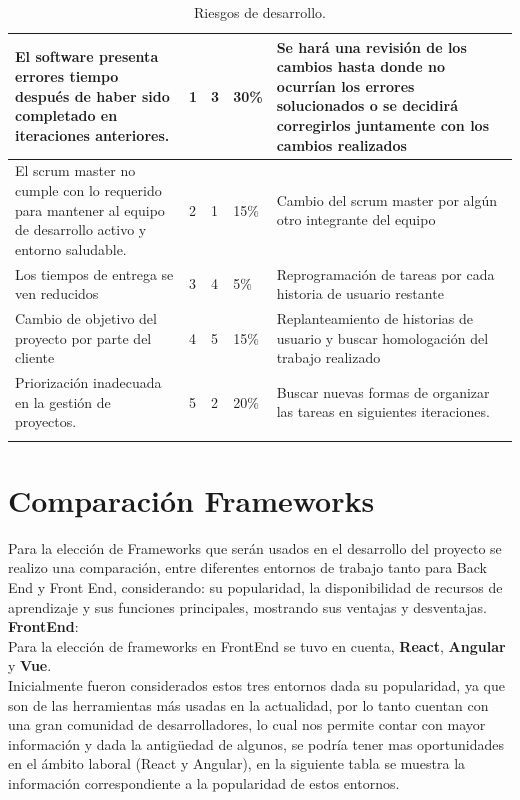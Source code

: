 \documentclass[a4paper,12 pt]{article}
\begin{document}
{\begin{longtable}{|M{4cm}|M{1cm}|M{1.5cm}|M{2.5cm}|M{6cm}|}
    \hline
    El software presenta errores tiempo después de haber sido completado en
    iteraciones anteriores.
    & 1 & 3  & 30\%  
    & Se hará una revisión de los cambios hasta donde no ocurrían los errores
    solucionados o se decidirá corregirlos juntamente con los cambios realizados
    \\
    \hline
    El scrum master no cumple con lo requerido para mantener al equipo de
    desarrollo activo y entorno saludable.
    & 2 & 1  &  15\%
    &  Cambio del scrum master por algún otro integrante del equipo  \\
    \hline
    Los tiempos de entrega se ven reducidos
    & 3 &  4 & 5\%  
    &  Reprogramación de tareas por cada historia de usuario restante \\
    \hline
    Cambio de objetivo del proyecto por parte del cliente
    & 4 & 5  & 15\%  
    & Replanteamiento de historias de usuario y buscar homologación del trabajo
    realizado  \\
    \hline
    Priorización inadecuada en la gestión de proyectos.
    & 5 & 2  & 20\%
    & Buscar nuevas formas de organizar las tareas en siguientes iteraciones. \\
    \hline
    \caption{Riesgos de desarrollo.} 
    \label{Riesgos}
\end{longtable}}


\section {Comparación Frameworks }

Para la elección de Frameworks que serán usados en el desarrollo del proyecto se realizo una comparación, entre diferentes entornos de trabajo tanto para Back End y Front End, considerando: su popularidad, la disponibilidad de recursos de aprendizaje y sus funciones principales, mostrando sus ventajas y desventajas.\\

\textbf{FrontEnd}:\\

Para la elección de frameworks en FrontEnd se tuvo en cuenta, \textbf{React}, \textbf{Angular} y \textbf{Vue}.\\

Inicialmente fueron considerados estos tres entornos dada su popularidad, ya que son de las herramientas más usadas en la actualidad, por lo tanto cuentan con una gran comunidad de desarrolladores, lo cual nos permite contar con mayor información y dada la antigüedad de algunos, se podría tener mas oportunidades en el ámbito laboral (React y Angular), en la siguiente tabla se muestra la información correspondiente a la popularidad de estos entornos. 
\end{document}
